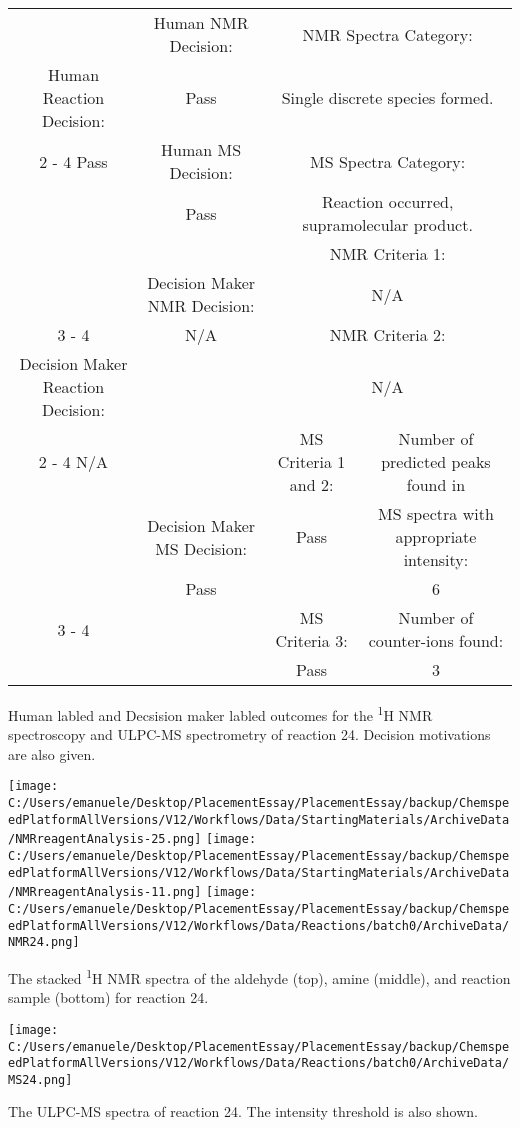 \documentclass{article}%
\begin{document}
\begin{Decision Table}[H]%
\begin{tabular}{|c|c|c|c|}%
\hline%
&Human NMR Decision:&\multicolumn{2}{|c|}{NMR Spectra Category:}\\%
Human Reaction Decision:&Pass&\multicolumn{2}{|c|}{Single discrete species formed.}\\%
\cline{2%
-%
4}%
Pass&Human MS Decision:&\multicolumn{2}{|c|}{MS Spectra Category:}\\%
&Pass&\multicolumn{2}{|c|}{Reaction occurred, supramolecular product.}\\%
\hline%
&&\multicolumn{2}{|c|}{NMR Criteria 1:}\\%
&Decision Maker NMR Decision:&\multicolumn{2}{|c|}{N/A}\\%
\cline{3%
-%
4}%
&N/A&\multicolumn{2}{|c|}{NMR Criteria 2:}\\%
Decision Maker Reaction Decision:&&\multicolumn{2}{|c|}{N/A}\\%
\cline{2%
-%
4}%
N/A&&MS Criteria 1 and 2:&Number of predicted peaks found in\\%
&Decision Maker MS Decision:&Pass&MS spectra with appropriate intensity:\\%
&Pass&&6\\%
\cline{3%
-%
4}%
&&MS Criteria 3:&Number of counter{-}ions found:\\%
&&Pass&3\\%
\hline%
\end{tabular}%
\caption{Human labled and Decsision maker labled outcomes for the \textsuperscript{1}H NMR spectroscopy and ULPC-MS spectrometry of reaction 24. Decision motivations are also given.}%
\end{Decision Table}%
\begin{NMR Spectra}[H]%
\begin{center}%
\texttt{[image: C:/Users/emanuele/Desktop/PlacementEssay/PlacementEssay/backup/ChemspeedPlatformAllVersions/V12/Workflows/Data/StartingMaterials/ArchiveData/NMRreagentAnalysis-25.png]}\hfill%
\texttt{[image: C:/Users/emanuele/Desktop/PlacementEssay/PlacementEssay/backup/ChemspeedPlatformAllVersions/V12/Workflows/Data/StartingMaterials/ArchiveData/NMRreagentAnalysis-11.png]}\hfill%
\texttt{[image: C:/Users/emanuele/Desktop/PlacementEssay/PlacementEssay/backup/ChemspeedPlatformAllVersions/V12/Workflows/Data/Reactions/batch0/ArchiveData/NMR24.png]}\hfill%
\end{center}%
\caption{The stacked \textsuperscript{1}H NMR spectra of the aldehyde (top), amine (middle), and reaction sample (bottom) for reaction 24.}%
\end{NMR Spectra}%
\begin{MS Spectra}[H]%
\begin{center}%
\texttt{[image: C:/Users/emanuele/Desktop/PlacementEssay/PlacementEssay/backup/ChemspeedPlatformAllVersions/V12/Workflows/Data/Reactions/batch0/ArchiveData/MS24.png]}\hfill%
\end{center}%
\caption{The ULPC-MS spectra of reaction 24. The intensity threshold is also shown.}%
\end{MS Spectra}%
\end{document}
